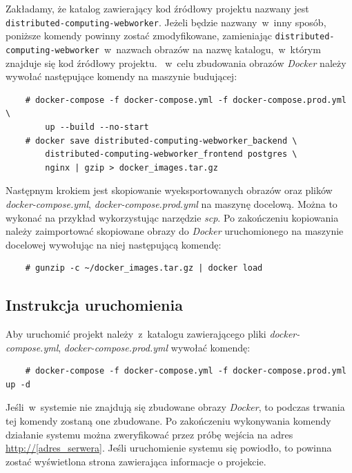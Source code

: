 \documentclass[a4paper,11pt,twoside]{report}
\theoremstyle{definition}
\begin{document}
        Zakładamy, że katalog zawierający kod źródłowy projektu nazwany jest \texttt{distributed-computing-webworker}. Jeżeli będzie nazwany~w~inny sposób, poniższe komendy powinny zostać zmodyfikowane, zamieniając \texttt{distributed-computing-webworker}~w~nazwach obrazów na nazwę katalogu,~w~którym znajduje się kod źródłowy projektu. 
       ~w~celu zbudowania obrazów \textit{Docker} należy wywołać następujące komendy na maszynie budującej:

        \begin{verbatim}
    # docker-compose -f docker-compose.yml -f docker-compose.prod.yml \
        up --build --no-start
    # docker save distributed-computing-webworker_backend \
        distributed-computing-webworker_frontend postgres \
        nginx | gzip > docker_images.tar.gz    
        \end{verbatim}

        Następnym krokiem jest skopiowanie wyeksportowanych obrazów oraz plików \textit{docker-compose.yml}, \textit{docker-compose.prod.yml} na maszynę docelową. Można to wykonać na przykład wykorzystując narzędzie \textit{scp}.
        Po zakończeniu kopiowania należy zaimportować skopiowane obrazy do \textit{Docker} uruchomionego na maszynie docelowej wywołując na niej następującą komendę:

        \begin{verbatim}
    # gunzip -c ~/docker_images.tar.gz | docker load
        \end{verbatim}

    \subsection{Instrukcja uruchomienia}
        \label{start-system}
        Aby uruchomić projekt należy~z~katalogu zawierającego pliki \textit{docker-compose.yml}, \textit{docker-compose.prod.yml} wywołać komendę:

        \begin{verbatim}
    # docker-compose -f docker-compose.yml -f docker-compose.prod.yml up -d
        \end{verbatim}

        Jeśli~w~systemie nie znajdują się zbudowane obrazy \textit{Docker}, to podczas trwania tej komendy zostaną one zbudowane.
        Po zakończeniu wykonywania komendy działanie systemu można zweryfikować przez próbę wejścia na adres \url{http://[adres_serwera]}. Jeśli uruchomienie systemu się powiodło, to powinna zostać wyświetlona strona zawierająca informacje o projekcie.
\end{document}
